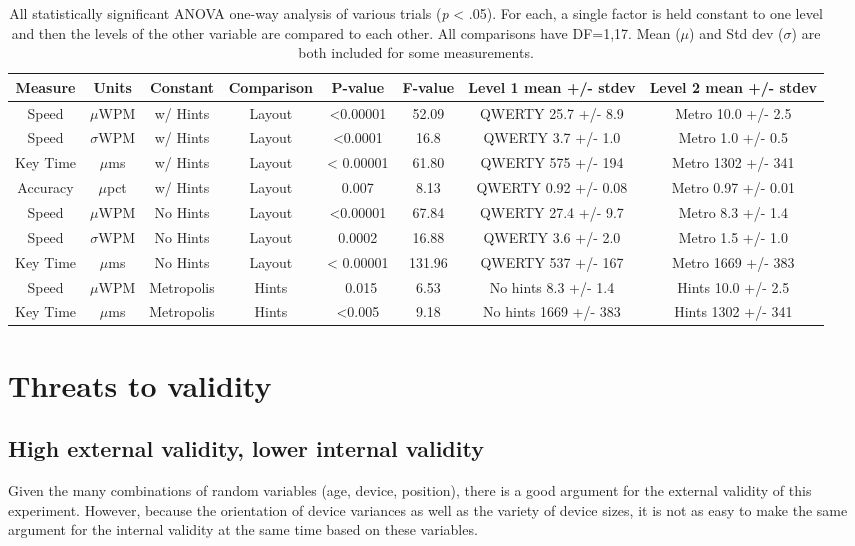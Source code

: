 \documentclass[english]{vgtc}
\begin{document}
\begin{table}[]
  \centering
  \begin{tabular}{c|c|c|c|c|c|c|c}
  \toprule
  Measure & Units & Constant & Comparison & P-value & F-value & Level 1 mean +/- stdev & Level 2 mean +/- stdev \\
  \midrule
  Speed & $\mu$WPM & w/ Hints & Layout & <0.00001 & 52.09 & QWERTY 25.7 +/- 8.9 & Metro 10.0 +/- 2.5 \\
  Speed & $\sigma$WPM & w/ Hints & Layout & <0.0001 & 16.8 & QWERTY 3.7 +/- 1.0 & Metro 1.0 +/- 0.5 \\
  Key Time & $\mu$ms & w/ Hints & Layout & < 0.00001 & 61.80 & QWERTY 575 +/- 194 & Metro 1302 +/- 341 \\
  Accuracy & $\mu$pct & w/ Hints & Layout & 0.007 & 8.13 & QWERTY 0.92 +/- 0.08 & Metro 0.97 +/- 0.01 \\
  Speed & $\mu$WPM & No Hints & Layout & <0.00001 & 67.84 & QWERTY 27.4 +/- 9.7 & Metro 8.3 +/- 1.4 \\
  Speed & $\sigma$WPM & No Hints & Layout & 0.0002 & 16.88 & QWERTY 3.6 +/- 2.0 & Metro 1.5 +/- 1.0 \\
  Key Time & $\mu$ms & No Hints & Layout & < 0.00001 & 131.96 & QWERTY 537 +/- 167 & Metro 1669 +/- 383 \\
  Speed & $\mu$WPM & Metropolis & Hints & ~0.015 & 6.53 & No hints 8.3 +/- 1.4 & Hints 10.0 +/- 2.5 \\
  Key Time & $\mu$ms & Metropolis & Hints & <0.005 & 9.18 & No hints 1669 +/- 383 & Hints 1302 +/- 341 \\
  \bottomrule
  \end{tabular}
  \caption{All statistically significant ANOVA one-way analysis of various trials (\emph{p} < .05).  For each, a single factor is held constant to one level and then the levels of the other variable are compared to each other. All comparisons have DF=1,17. Mean ($\mu$) and Std dev ($\sigma$) are both included for some measurements.}
  \label{table:anova}
\end{table}

\section{Threats to validity}
\subsection{High external validity, lower internal validity}
Given the many combinations of random variables (age, device, position), there is a good argument for the external validity of this experiment.  However, because the orientation of device variances as well as the variety of device sizes, it is not as easy to make the same argument for the internal validity at the same time based on these variables.
\end{document}
